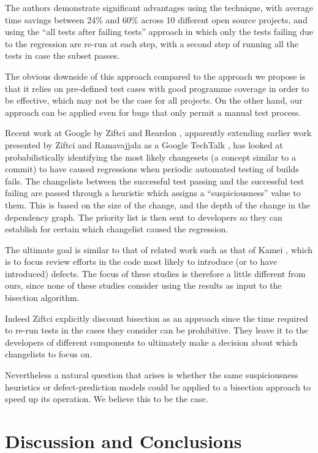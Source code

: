 \documentclass[10pt,journal,compsoc]{IEEEtran}
\begin{document}
The authors demonstrate significant advantages using the technique, with average time savings between 24\% and 60\% across 10 different open source projects, and using the ``all tests after failing tests'' approach in which only the tests failing due to the regression are re-run at each step, with a second step of running all the tests in case the subset passes.

The obvious downside of this approach compared to the approach we propose is that it relies on pre-defined test cases with good programme coverage in order to be effective, which may not be the case for all projects. On the other hand, our approach can be applied even for bugs that only permit a manual test process.

Recent work at Google by Ziftci and Reardon \cite{ziftci2017}, apparently extending earlier work presented by Ziftci and Ramavajjala as a Google TechTalk \cite{ziftci2013}, has looked at probabilistically identifying the most likely changesets (a concept similar to a commit) to have caused regressions when periodic automated testing of builds fails. The changelists between the successful test passing and the successful test failing are passed through a heuristic which assigns a ``suspiciousness'' value to them. This is based on the size of the change, and the depth of the change in the dependency graph. The priority list is then sent to developers so they can establish for certain which changelist caused the regression. 

The ultimate goal is similar to that of related work such as that of Kamei \etal, which is to focus review efforts in the code most likely to introduce (or to have introduced) defects. The focus of these studies is therefore a little different from ours, since none of these studies consider using the results as input to the bisection algorithm.

Indeed Ziftci \etal explicitly discount bisection as an approach since the time required to re-run tests in the cases they consider can be prohibitive. They leave it to the developers of different components to ultimately make a decision about which changelists to focus on.

Nevertheless a natural question that arises is whether the same suspiciousness heuristics or defect-prediction models could be applied to a bisection approach to speed up its operation. We believe this to be the case. 

\section{Discussion and Conclusions}
\end{document}
